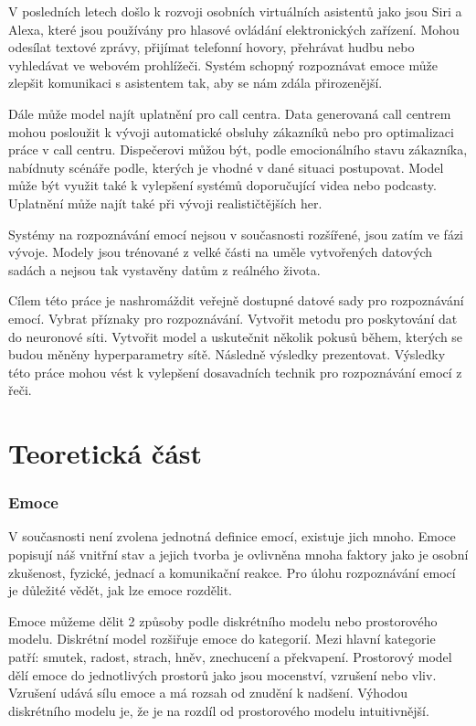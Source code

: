 \documentclass[FM,BP]{tulthesis}
\begin{document}
V posledních letech došlo k rozvoji osobních virtuálních asistentů jako jsou Siri a Alexa, které jsou používány pro hlasové ovládání elektronických zařízení. Mohou odesílat textové zprávy, přijímat telefonní hovory, přehrávat hudbu nebo vyhledávat ve webovém prohlížeči. Systém schopný rozpoznávat emoce může zlepšit komunikaci s asistentem tak, aby se nám zdála přirozenější.\cite{DBLP:journals/corr/abs-1912-10458} 

Dále může model najít uplatnění pro call centra. Data generovaná call centrem mohou posloužit k vývoji automatické obsluhy zákazníků nebo pro optimalizaci práce v call centru. Dispečerovi můžou být, podle emocionálního stavu zákazníka, nabídnuty scénáře podle, kterých je vhodné v dané situaci postupovat. Model může být využit také k vylepšení systémů doporučující videa nebo podcasty. Uplatnění může najít také při vývoji realističtějších her. \cite{konar_chakraborty_2015}

Systémy na rozpoznávání emocí nejsou v současnosti rozšířené, jsou zatím ve fázi vývoje. Modely jsou trénované z velké části na uměle vytvořených datových sadách a nejsou tak vystavěny datům z reálného života. \cite{konar_chakraborty_2015}

Cílem této práce je nashromáždit veřejně dostupné datové sady pro rozpoznávání emocí. Vybrat příznaky pro rozpoznávání. Vytvořit metodu pro poskytování dat do neuronové síti. Vytvořit model a uskutečnit několik pokusů během, kterých se budou měněny hyperparametry sítě. Následně výsledky prezentovat. Výsledky této práce mohou vést k vylepšení dosavadních technik pro rozpoznávání emocí z řeči. 

\chapter{Teoretická část}

\subsection{Emoce}
V současnosti není zvolena jednotná definice emocí, existuje jich mnoho. Emoce popisují náš vnitřní stav a jejich tvorba je ovlivněna mnoha faktory jako je osobní zkušenost, fyzické, jednací a komunikační reakce. Pro úlohu rozpoznávání emocí je důležité vědět, jak lze emoce rozdělit\cite{DBLP:journals/speech/AkcayO20}.

Emoce můžeme dělit 2 způsoby podle diskrétního modelu nebo prostorového modelu. Diskrétní model rozšiřuje emoce do kategorií. Mezi hlavní kategorie patří: smutek, radost, strach, hněv, znechucení a překvapení. Prostorový model dělí emoce do jednotlivých prostorů jako jsou mocenství, vzrušení nebo vliv. Vzrušení udává sílu emoce a má rozsah od znudění k nadšení. Výhodou diskrétního modelu je, že je na rozdíl od prostorového modelu intuitivnější.\cite{DBLP:journals/speech/AkcayO20}
\end{document}
